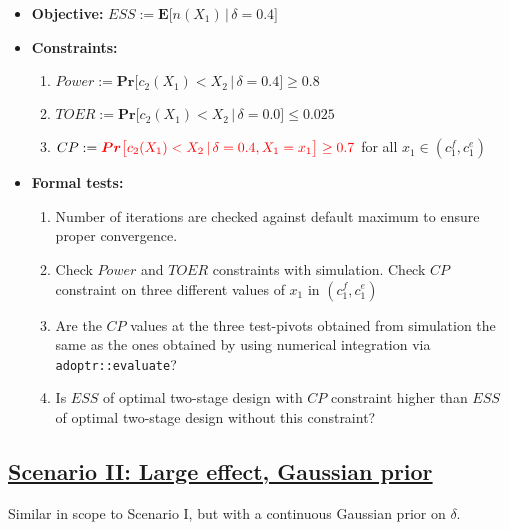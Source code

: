 \documentclass[]{book}
\providecommand{\tightlist}{%
  \setlength{\itemsep}{0pt}\setlength{\parskip}{0pt}}
\begin{document}
\begin{itemize}
\tightlist
\item
  \textbf{Objective:} \(ESS := \boldsymbol{E}\big[n(X_1)\,|\,\delta=0.4\big]\)
\item
  \textbf{Constraints:}

  \begin{enumerate}
  \def\labelenumi{\arabic{enumi}.}
  \tightlist
  \item
    \(Power := \boldsymbol{Pr}\big[c_2(X_1) < X_2\,|\,\delta=0.4\big] \geq 0.8\)
  \item
    \(TOER := \boldsymbol{Pr}\big[c_2(X_1) < X_2\,|\,\delta=0.0\big] \leq 0.025\)
  \item
    \(CP := \color{red}{\boldsymbol{Pr}\big[c_2(X_1) < X_2\,|\,\delta=0.4, X_1 = x_1\big] \geq 0.7}\) for all \(x_1\in(c_1^f, c_1^e)\)
  \end{enumerate}
\item
  \textbf{Formal tests:}

  \begin{enumerate}
  \def\labelenumi{\arabic{enumi}.}
  \tightlist
  \item
    Number of iterations are checked against default maximum to ensure proper
    convergence.
  \item
    Check \(Power\) and \(TOER\) constraints with simulation.
    Check \(CP\) constraint on three different values of \(x_1\) in
    \((c_1^f, c_1^e)\)
  \item
    Are the \(CP\) values at the three test-pivots obtained from simulation the
    same as the ones obtained by using numerical integration via
    \texttt{adoptr::evaluate}?
  \item
    Is \(ESS\) of optimal two-stage design with \(CP\) constraint higher than
    \(ESS\) of optimal two-stage design without this constraint?
  \end{enumerate}
\end{itemize}

\hypertarget{scenario-ii-large-effect-gaussian-prior}{%
\subsection{\texorpdfstring{\protect\hyperlink{scenarioII}{Scenario II: Large effect, Gaussian prior}}{Scenario II: Large effect, Gaussian prior}}\label{scenario-ii-large-effect-gaussian-prior}}

Similar in scope to Scenario I, but with a continuous Gaussian prior on \(\delta\).
\end{document}
